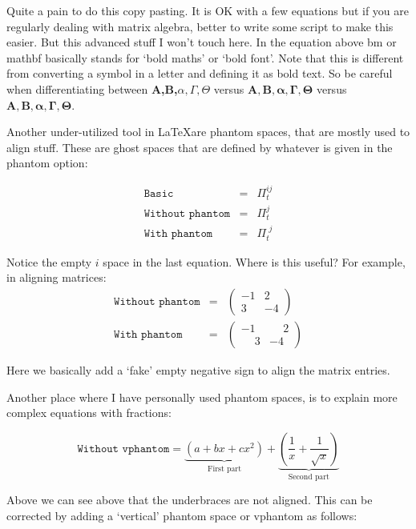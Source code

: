 \documentclass[11pt]{article}
\numberwithin{table}{section}   %
\begin{document}
Quite a pain to do this copy pasting. It is OK with a few equations but if you are regularly dealing with matrix algebra, better to write some script to make this easier. But this advanced stuff I won't touch here. In the equation above bm or mathbf basically stands for `bold maths' or `bold font'. Note that this is different from converting a symbol in a letter and defining it as bold text. So be careful when differentiating between \textbf{A,B,$\alpha,\Gamma,\Theta$} versus $\bm{A,B,\alpha,\Gamma,\Theta}$ versus  $\mathbf{A,B,\alpha,\Gamma,\Theta}$.

Another under-utilized tool in \LaTeX are phantom spaces, that are mostly used to align stuff. These are ghost spaces that are defined by whatever is given in the phantom option:

\begin{eqnarray}
    \texttt{Basic} &=& \Pi^{ij}_t \\ \nonumber
    \texttt{Without phantom} &=& \Pi^{j}_t \\ \nonumber
    \texttt{With phantom} &=& \Pi^{\phantom{i}j}_t
\end{eqnarray}

Notice the empty $i$ space in the last equation. Where is this useful? For example, in aligning matrices:
\begin{eqnarray}
    \texttt{Without phantom} &=& \begin{pmatrix} -1 & 2 \\ 3 & -4  \end{pmatrix} \\ \nonumber
    \texttt{With phantom}    &=& \begin{pmatrix} -1 & \phantom{-}2 \\ \phantom{-}3 & -4  \end{pmatrix}
\end{eqnarray}

Here we basically add a `fake' empty negative sign to align the matrix entries.

Another place where I have personally used phantom spaces, is to explain more complex equations with fractions:

\begin{equation}
    \texttt{Without vphantom} = \underbrace{\left(a + bx + cx^2\right)}_{\text{First part}} + \underbrace{\left(\frac{1}{x} + \frac{1}{\sqrt{x}}\right)}_{\text{Second part}}  
\end{equation}

Above we can see above that the underbraces are not aligned. This can be corrected by adding a `vertical' phantom space or vphantom as follows:
\end{document}
